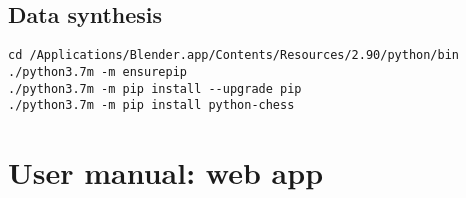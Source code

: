 \documentclass[../../main.tex]{subfiles}
\begin{document}
\section{Data synthesis}
\label{sec:user_man_chesscog_data_synthesis}
\begin{verbatim}
cd /Applications/Blender.app/Contents/Resources/2.90/python/bin
./python3.7m -m ensurepip
./python3.7m -m pip install --upgrade pip
./python3.7m -m pip install python-chess
\end{verbatim}

\chapter{User manual: web app}
\label{chap:user_man_chesscogapp}
\end{document}
